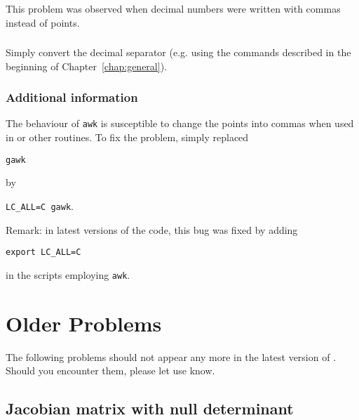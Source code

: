 \subsubsection{\question}


This problem was observed when decimal numbers were written with commas instead of points.


\subsubsection{\answer}

Simply convert the decimal separator (e.g. using the commands described in the beginning of Chapter~\ref{chap:general}).


\subsubsection{Additional information}

The behaviour of \texttt{awk} is susceptible to change the points into commas when used in  or other routines. To fix the problem, simply replaced

\texttt{gawk}

by

\texttt{LC\_ALL=C gawk}.

Remark: in latest versions of the code, this bug was fixed by adding 

\texttt{export LC\_ALL=C}

in the scripts employing \texttt{awk}.


\section{Older Problems}

The following problems should not appear any more in the latest version of \diva. Should you encounter them, please let use know.


\subsection{Jacobian matrix with null determinant}

